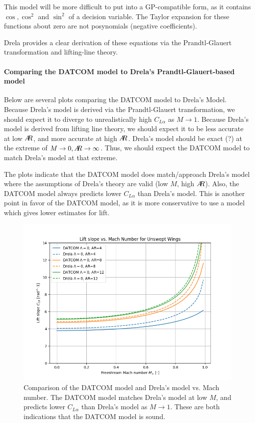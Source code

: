 \documentclass[12pt]{article}
\newcommand{\ar}{A\mkern-6mu R}
\begin{document}
This model will be more difficult to put into a GP-compatible form, as it contains $\cos, \cos^2$ and $\sin^2$ of a decision variable. The Taylor expansion for these functions about zero are not posynomials (negative coefficients).

Drela provides a clear derivation of these equations via the Prandtl-Glauert transformation and lifting-line theory. 


\paragraph{Comparing the DATCOM model to Drela's Prandtl-Glauert-based model}
Below are several plots comparing the DATCOM model to Drela's Model. Because Drela's model is derived via the Prandtl-Glauert transformation, we should expect it to diverge to unrealistically high $C_{L\alpha}$ as $M \rightarrow 1$. Because Drela's model is derived from lifting line theory, we should expect it to be less accurate at low $\ar$, and more accurate at high $\ar$.
Drela's model should be exact (?) at the extreme of $M \rightarrow 0, \ar \rightarrow \infty$. Thus, we should expect the DATCOM model to match Drela's model at that extreme.

The plots indicate that the DATCOM model does match/approach Drela's model where the assumptions of Drela's theory are valid (low $M$, high $\ar$). Also, the DATCOM model always predicts lower $C_{L\alpha}$ than Drela's model. This is another point in favor of the DATCOM model, as it is more conservative to use a model which gives lower estimates for lift.

\begin{figure}[hbt!]
    \centering
    \includegraphics[width=1\textwidth]{figures/wing_lift_model_compare/CLa_vs_mach}
    \caption{\label{fig:wing_model_CLa_vs_mach} Comparison of the DATCOM model and Drela's model vs. Mach number. The DATCOM model matches Drela's model at low $M$, and predicts lower $C_{L\alpha}$ than Drela's model as $M \rightarrow 1$. These are both indications that the DATCOM model is sound.}
\end{figure}
\end{document}
